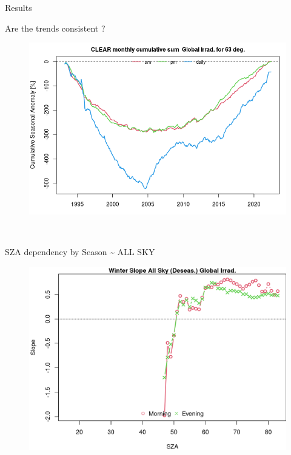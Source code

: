 \documentclass[
  ignorenonframetext,
]{beamer}
\begin{document}
\begin{frame}{Results}
\begin{block}{Are the trends consistent ?}
\begin{figure}
\begin{minipage}[t]{0.50\linewidth}
{}

\end{minipage}%
%
\begin{minipage}[t]{0.50\linewidth}

{\centering 

\includegraphics[width=4.48in,height=\textheight]{images/DHI_GHI_3_trends_consistency_files/figure-html/cumulativesums-4.png}

}

\end{minipage}%

\end{figure}

~

\end{block}

\begin{block}{SZA dependency by Season \textasciitilde{} ALL SKY}
\protect\hypertarget{sza-dependency-by-season-all-sky}{}
\begin{figure}

\begin{minipage}[t]{0.50\linewidth}

{\centering 

\includegraphics[width=4.48in,height=\textheight]{images/DHI_GHI_2_sza_trends_files/figure-html/szatrendsseas-6.png}

}
\end{minipage}
\end{figure}
\end{block}
\end{frame}
\end{document}
